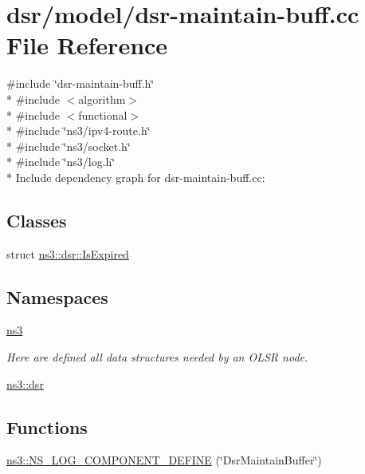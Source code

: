 \hypertarget{dsr-maintain-buff_8cc}{}\section{dsr/model/dsr-\/maintain-\/buff.cc File Reference}
\label{dsr-maintain-buff_8cc}
{\ttfamily \#include \char`\"{}dsr-\/maintain-\/buff.\+h\char`\"{}}\\*
{\ttfamily \#include $<$algorithm$>$}\\*
{\ttfamily \#include $<$functional$>$}\\*
{\ttfamily \#include \char`\"{}ns3/ipv4-\/route.\+h\char`\"{}}\\*
{\ttfamily \#include \char`\"{}ns3/socket.\+h\char`\"{}}\\*
{\ttfamily \#include \char`\"{}ns3/log.\+h\char`\"{}}\\*
Include dependency graph for dsr-\/maintain-\/buff.cc\+:
\subsection*{Classes}
\begin{DoxyCompactItemize}
\item 
struct \hyperlink{structns3_1_1dsr_1_1IsExpired}{ns3\+::dsr\+::\+Is\+Expired}
\end{DoxyCompactItemize}
\subsection*{Namespaces}
\begin{DoxyCompactItemize}
\item 
 \hyperlink{namespacens3}{ns3}
\begin{DoxyCompactList}\small\item\em Here are defined all data structures needed by an O\+L\+SR node. \end{DoxyCompactList}\item 
 \hyperlink{namespacens3_1_1dsr}{ns3\+::dsr}
\end{DoxyCompactItemize}
\subsection*{Functions}
\begin{DoxyCompactItemize}
\item 
\hyperlink{namespacens3_a88f376175ecedf301c1154fa201d56de}{ns3\+::\+N\+S\+\_\+\+L\+O\+G\+\_\+\+C\+O\+M\+P\+O\+N\+E\+N\+T\+\_\+\+D\+E\+F\+I\+NE} (\char`\"{}Dsr\+Maintain\+Buffer\char`\"{})
\end{DoxyCompactItemize}
